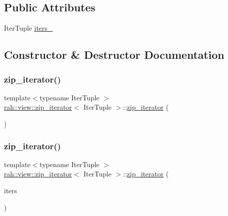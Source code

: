 \subsection*{Public Attributes}
\begin{DoxyCompactItemize}
\item 
Iter\+Tuple \mbox{\hyperlink{structrah_1_1view_1_1zip__iterator_a58f5f6dd935fe51dd3c3a28e3b06ecc9}{iters\+\_\+}}
\end{DoxyCompactItemize}


\subsection{Constructor \& Destructor Documentation}
\mbox{\label{structrah_1_1view_1_1zip__iterator_a8ba7af8259dc507b57d1e3371c7f40a2}} 
\subsubsection{\texorpdfstring{zip\_iterator()}{zip\_iterator()}\hspace{0.1cm}{\footnotesize\ttfamily [1/4]}}
{\footnotesize\ttfamily template$<$typename Iter\+Tuple $>$ \\
\mbox{\hyperlink{structrah_1_1view_1_1zip__iterator}{rah\+::view\+::zip\+\_\+iterator}}$<$ Iter\+Tuple $>$\+::\mbox{\hyperlink{structrah_1_1view_1_1zip__iterator}{zip\+\_\+iterator}} (\begin{DoxyParamCaption}{ }\end{DoxyParamCaption})\hspace{0.3cm}{\ttfamily [default]}}

\mbox{\label{structrah_1_1view_1_1zip__iterator_a2f6b7c790bcb819a68e4828f6bd6ef79}} 
\subsubsection{\texorpdfstring{zip\_iterator()}{zip\_iterator()}\hspace{0.1cm}{\footnotesize\ttfamily [2/4]}}
{\footnotesize\ttfamily template$<$typename Iter\+Tuple $>$ \\
\mbox{\hyperlink{structrah_1_1view_1_1zip__iterator}{rah\+::view\+::zip\+\_\+iterator}}$<$ Iter\+Tuple $>$\+::\mbox{\hyperlink{structrah_1_1view_1_1zip__iterator}{zip\+\_\+iterator}} (\begin{DoxyParamCaption}\item[{Iter\+Tuple const \&}]{iters }\end{DoxyParamCaption})\hspace{0.3cm}{\ttfamily [inline]}}

